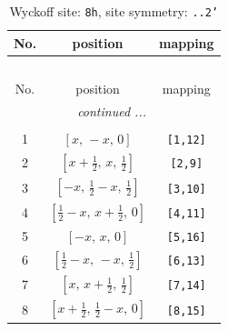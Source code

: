 \documentclass[fleqn,8pt]{jsarticle}
\begin{document}
\begin{longtable}{ccc}
\caption{Wyckoff site: {\tt 8h}, site symmetry: {\tt ..2'}}
 \\
 \hline \hline
No. & position & mapping \\ \hline \endfirsthead

\multicolumn{2}{l}{\tablename\ \thetable{}} \\
 \hline \hline
No. & position & mapping \\ \hline \endhead

 \hline \hline
\multicolumn{2}{r}{\footnotesize\it continued ...} \\ \endfoot

 \hline \hline
\multicolumn{2}{r}{} \\ \endlastfoot

1 & $\left[ x,\, - x,\, 0 \right]$ & {\tt [1,12]} \\ \hline
2 & $\left[ x + \frac{1}{2},\, x,\, \frac{1}{2} \right]$ & {\tt [2,9]} \\ \hline
3 & $\left[ - x,\, \frac{1}{2} - x,\, \frac{1}{2} \right]$ & {\tt [3,10]} \\ \hline
4 & $\left[ \frac{1}{2} - x,\, x + \frac{1}{2},\, 0 \right]$ & {\tt [4,11]} \\ \hline
5 & $\left[ - x,\, x,\, 0 \right]$ & {\tt [5,16]} \\ \hline
6 & $\left[ \frac{1}{2} - x,\, - x,\, \frac{1}{2} \right]$ & {\tt [6,13]} \\ \hline
7 & $\left[ x,\, x + \frac{1}{2},\, \frac{1}{2} \right]$ & {\tt [7,14]} \\ \hline
8 & $\left[ x + \frac{1}{2},\, \frac{1}{2} - x,\, 0 \right]$ & {\tt [8,15]} \\
\end{longtable}
\renewcommand{\arraystretch}{1.2}
\end{document}
